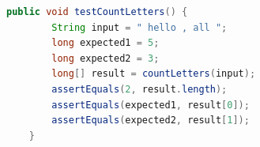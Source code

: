 \begin{lstlisting}[float,caption={A test for countLetters.},stepnumber=2,numberfirstline=false,label=lst:testCountLetters,language=Java]
    public void testCountLetters() {
        String input = " hello , all ";
        long expected1 = 5;
        long expected2 = 3;
        long[] result = countLetters(input);
        assertEquals(2, result.length);
        assertEquals(expected1, result[0]);
        assertEquals(expected2, result[1]);
    }
\end{lstlisting}

%
%
%
%
